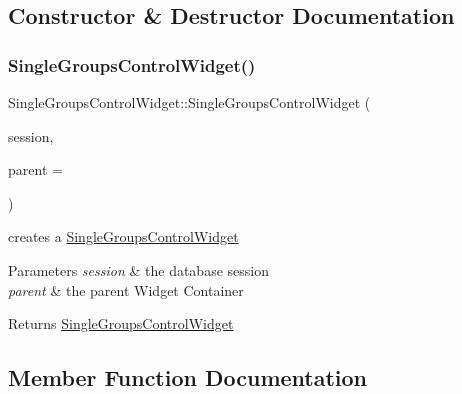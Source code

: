 \subsection{Constructor \& Destructor Documentation}
\mbox{\label{class_single_groups_control_widget_a49e2f9e4c74289cf0d3167283e14fded}} 
\subsubsection{\texorpdfstring{Single\+Groups\+Control\+Widget()}{SingleGroupsControlWidget()}}
{\footnotesize\ttfamily Single\+Groups\+Control\+Widget\+::\+Single\+Groups\+Control\+Widget (\begin{DoxyParamCaption}\item[{\hyperlink{class_session}{Session} $\ast$}]{session,  }\item[{Wt\+::\+W\+Container\+Widget $\ast$}]{parent = {} }\end{DoxyParamCaption})}



creates a \hyperlink{class_single_groups_control_widget}{Single\+Groups\+Control\+Widget} 


\begin{DoxyParams}{Parameters}
{\em session} & the database session \\
\hline
{\em parent} & the parent Widget Container \\
\hline
\end{DoxyParams}
\begin{DoxyReturn}{Returns}
\hyperlink{class_single_groups_control_widget}{Single\+Groups\+Control\+Widget} 
\end{DoxyReturn}


\subsection{Member Function Documentation}
\mbox{\label{class_single_groups_control_widget_a3d83beb8c90183e11332bba1a4eab77d}} 
